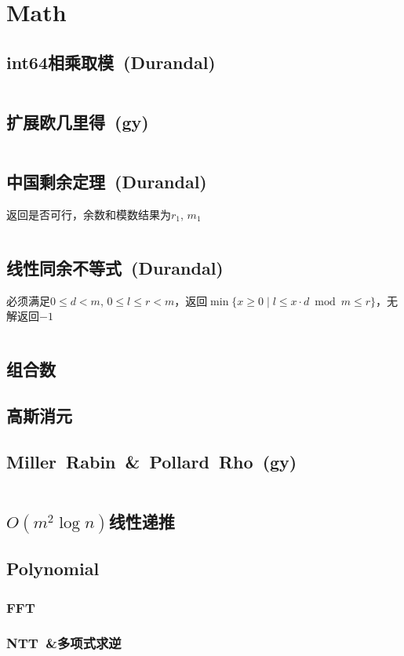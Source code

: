 \chapter{Math}
\section{int64相乘取模\ \small(Durandal)}
\inputminted{cpp}{Math/int64_multiply_mod.cpp}
\section{扩展欧几里得\ \small(gy)}
\inputminted{cpp}{Math/extend_gcd.cpp}
\section{中国剩余定理\ \small(Durandal)}
返回是否可行，余数和模数结果为$ r_1 $, $ m_1 $
\inputminted{cpp}{Math/chinese_remainder_theorem.cpp}
\section{线性同余不等式\ \small(Durandal)}
必须满足$ 0 \leq d < m $, $ 0 \leq l \leq r < m $，返回$ \min\lbrace x \geq 0 \mid l \leq x \cdot d \bmod m \leq r \rbrace $，无解返回$ -1 $ 
\inputminted{cpp}{Math/linear_congruence_inequality.cpp}
\section{组合数}
\section{高斯消元}
\section{Miller\ Rabin\ \&\ Pollard\ Rho\ \small(gy)}
\inputminted{cpp}{Math/miller_rabin_and_pollard_rho.cpp}
\section{$ O(m ^ 2 \log n) $线性递推}
\section{Polynomial}
\subsection{FFT}
\subsection{NTT\ \&多项式求逆}
